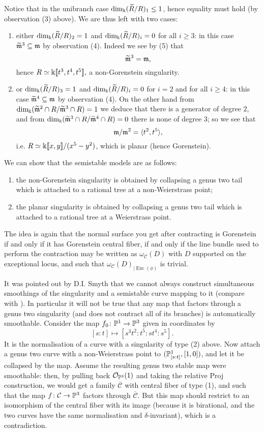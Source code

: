 Notice that in the unibranch case $\dim_\Bbbk(\widetilde{R}/R)_1\leq 1$, hence equality must hold (by observation (3) above). We are thus left with two cases:
 \begin{enumerate}
  \item either $\dim_\Bbbk(\widetilde{R}/R)_2=1$ and $\dim_\Bbbk(\widetilde{R}/R)_i=0$ for all $i\geq 3$: in this case $\widetilde{\mathfrak m}^3\subseteq\mathfrak m$ by observation (4). Indeed we see by (5) that \[\widetilde{\mathfrak m}^3=\mathfrak m,\] hence $R\simeq\Bbbk[\![t^3,t^4,t^5]\!],$ a non-Gorenstein singularity.
  
  \item or $\dim_\Bbbk(\widetilde{R}/R)_3=1$ and $\dim_\Bbbk(\widetilde{R}/R)_i=0$ for $i=2$ and for all $i\geq 4$: in this case $\widetilde{\mathfrak m}^4\subseteq\mathfrak m$ by observation (4). On the other hand from $\dim_\Bbbk(\widetilde{\mathfrak m}^2\cap R/\widetilde{\mathfrak m}^3\cap R)=1$ we deduce that there is a generator of degree $2$, and from $\dim_\Bbbk(\widetilde{\mathfrak m}^3\cap R/\widetilde{\mathfrak m}^4\cap R)=0$ there is none of degree $3$; so we see that \[\mathfrak m/\mathfrak m^2=\langle t^2,t^5\rangle,\] i.e. $R\simeq\Bbbk[\![x,y]\!]/(x^5-y^2)$, which is planar (hence Gorenstein).
 \end{enumerate}

We can show that the semistable models are as follows:
 \begin{enumerate}
  \item the non-Gorenstein singularity is obtained by collapsing a genus two tail which is attached to a rational tree at a non-Weierstrass point;
  \item the planar singularity is obtained by collapsing a genus two tail which is attached to a rational tree at a Weierstrass point.
 \end{enumerate}
The idea is again that the normal surface you get after contracting is Gorenstein if and only if it has Gorenstein central fiber, if and only if the line bundle used to perform the contraction may be written as $\omega_{\mathcal C}(D)$ with $D$ supported on the exceptional locus, and such that $\omega_{\mathcal C}(D)_{|\operatorname{Exc}(\phi)}$ is trivial.

\begin{rmk}
 It was pointed out by D.I. Smyth that we cannot always construct simultaneous smoothings of the singularity and a semistable curve mapping to it (compare with \cite[Lemma 2.11]{BCM}). In particular it will not be true that any map that factors through a genus two singularity (and does not contract all of its branches) is automatically smoothable. Consider the map $f_0\colon\mathbb P^1\rightarrow\mathbb P^3$ given in coordinates by \[ [s:t]\mapsto[s^3t^2:t^5:st^4:s^5].\]
 It is the normalisation of a curve with a singularity of type (2) above. Now attach a genus two curve with a non-Weierstrass point to $(\mathbb P^1_{[s:t]},[1,0])$, and let it be collapsed by the map. Assume the resulting genus two stable map were smoothable: then, by pulling back $\mathcal{O}_{\mathbb P^3}(1)$ and taking the relative Proj construction, we would get a family $\overline{\mathcal C}$ with central fiber of type (1), and such that the map $f\colon\mathcal C\rightarrow\mathbb P^3$ factors through $\overline{\mathcal C}$. But this map should restrict to an isomorphism of the central fiber with its image (because it is birational, and the two curves have the same normalisation and $\delta$-invariant), which is a contradiction.
\end{rmk}

